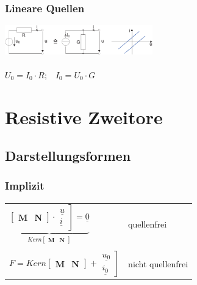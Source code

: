 \documentclass[a4paper,twocolumn,10pt]{article}
\begin{document}
\subsubsection*{Lineare Quellen}
\includegraphics[width=0.48\textwidth]{Grafiken/lineareQuellen}\\\\
$U_0=I_0\cdot R;\;\;\;I_0=U_0\cdot G$


\section*{Resistive Zweitore}
\subsection*{Darstellungsformen}
\subsubsection*{Implizit}
\begin{tabular}{ll}
$\underbrace{\begin{bmatrix}\textbf{M} & \textbf{N}\end{bmatrix}\cdot \left.\begin{matrix}\underline{u}\\\underline{i}\end{matrix}\right]=\underline{0}}_{Kern\begin{bmatrix}\textbf{M} & \textbf{N}\end{bmatrix}}$ & quellenfrei\\\\
$F=Kern\begin{bmatrix}\textbf{M} & \textbf{N}\end{bmatrix}+\left.\begin{matrix}\underline{u_0}\\\underline{i_0}\end{matrix}\right]$ & nicht quellenfrei
\end{tabular}
\end{document}
